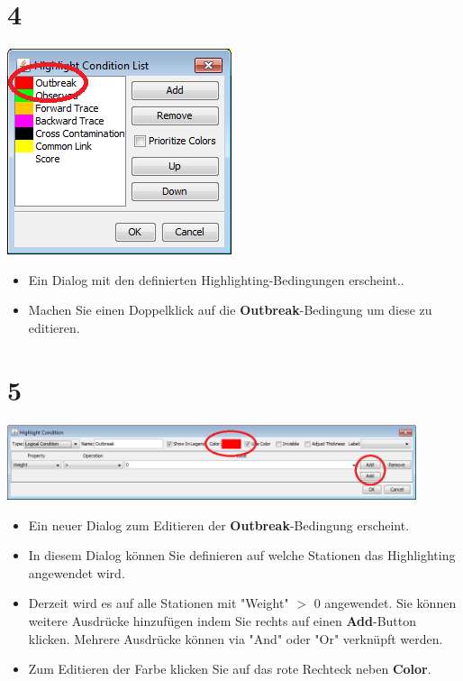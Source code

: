 \documentclass{beamer}
\begin{document}
\section{4}
\begin{frame}
	\begin{center}
  		\includegraphics[height=0.6\textheight]{4.png}
	\end{center}
	\begin{itemize}
		\item Ein Dialog mit den definierten Highlighting-Bedingungen erscheint..
		\item Machen Sie einen Doppelklick auf die \textbf{Outbreak}-Bedingung um diese zu editieren.
	\end{itemize}
\end{frame}

\section{5}
\begin{frame}
	\begin{center}
  		\includegraphics[width=0.9\textwidth]{5.png}
	\end{center}
	\begin{itemize}
		\item Ein neuer Dialog zum Editieren der \textbf{Outbreak}-Bedingung erscheint.
		\item In diesem Dialog können Sie definieren auf welche Stationen das Highlighting angewendet wird.
		\item Derzeit wird es auf alle Stationen mit "Weight" $>$ 0 angewendet. Sie können weitere Ausdrücke hinzufügen indem Sie rechts auf einen \textbf{Add}-Button klicken. Mehrere Ausdrücke können via "And" oder "Or" verknüpft werden.
		\item Zum Editieren der Farbe klicken Sie auf das rote Rechteck neben \textbf{Color}.
	\end{itemize}
\end{frame}
\end{document}
